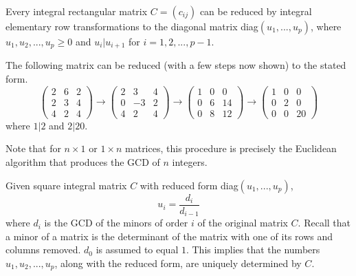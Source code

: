 \documentclass{article}
\begin{document}
  \begin{lemma}
    Every integral rectangular matrix $C = (c_{i j})$ can be reduced by integral elementary row transformations to the diagonal matrix diag$(u_1, ..., u_p)$, where $u_1, u_2, ..., u_p \geq 0$ and $u_i | u_{i+1}$ for $i = 1, 2, ..., p -1$. 
  \end{lemma}

  \begin{example}
    The following matrix can be reduced (with a few steps now shown) to the stated form. 
    \begin{equation}
    \begin{pmatrix} 2&6&2 \\ 2&3&4 \\ 4&2&4 \end{pmatrix} \rightarrow 
    \begin{pmatrix} 2&3&4 \\ 0&-3&2 \\ 4&2&4 \end{pmatrix} \rightarrow
    \begin{pmatrix} 1&0&0 \\ 0&6&14 \\ 0&8&12 \end{pmatrix} \rightarrow
    \begin{pmatrix} 1&0&0 \\ 0&2&0 \\ 0&0&20\end{pmatrix}
    \end{equation}
    where $1|2$ and $2|20$. 
  \end{example}

  Note that for $n \times 1$ or $1 \times n$ matrices, this procedure is precisely the Euclidean algorithm that produces the GCD of $n$ integers. 

  \begin{lemma}
    Given square integral matrix $C$ with  reduced form diag$(u_1, ..., u_p)$, 
    \begin{equation}
      u_i = \frac{d_i}{d_{i-1}}
    \end{equation}
    where $d_i$ is the GCD of the minors of order $i$ of the original matrix $C$. Recall that a minor of a matrix is the determinant of the matrix with one of its rows and columns removed. $d_0$ is assumed to equal $1$. This implies that the numbers $u_1, u_2, ..., u_p$, along with the reduced form, are uniquely determined by $C$. 
  \end{lemma}
\end{document}
